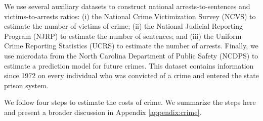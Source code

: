 We use several auxiliary datasets to construct national arrests-to-sentences and victims-to-arrests ratios: (i) the National Crime Victimization Survey (NCVS) to estimate the number of victims of crime; (ii) the National Judicial Reporting Program (NJRP) to estimate the number of sentences; and (iii) the Uniform Crime Reporting Statistics (UCRS) to estimate the number of arrests. Finally, we use microdata from the North Carolina Department of Public Safety (NCDPS) to estimate a prediction model for future crimes. This dataset contains information since 1972 on every individual who was convicted of a crime and entered the state prison system.

We follow four steps to estimate the costs of crime. We summarize the steps here and present a broader discussion in Appendix \ref{appendix:crime}.

